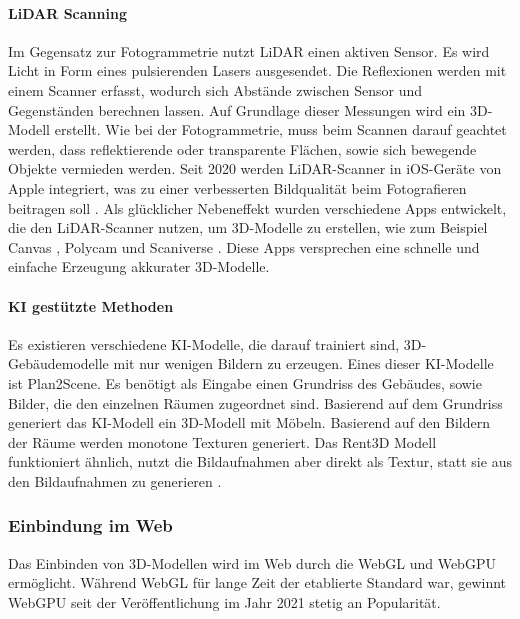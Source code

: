 \paragraph{LiDAR Scanning}
Im Gegensatz zur Fotogrammetrie nutzt \ac{LiDAR} einen aktiven Sensor. Es wird Licht in Form eines pulsierenden Lasers ausgesendet. Die Reflexionen werden mit einem Scanner erfasst, wodurch sich Abstände zwischen Sensor und Gegenständen berechnen lassen. Auf Grundlage dieser Messungen wird ein 3D-Modell erstellt. Wie bei der Fotogrammetrie, muss beim Scannen darauf geachtet werden, dass reflektierende oder transparente Flächen, sowie sich bewegende Objekte vermieden werden. Seit 2020 werden \ac{LiDAR}-Scanner in iOS-Geräte von Apple integriert, was zu einer verbesserten Bildqualität beim Fotografieren beitragen soll \cite{Fenstermaker2022}. Als glücklicher Nebeneffekt wurden verschiedene Apps entwickelt, die den \ac{LiDAR}-Scanner nutzen, um 3D-Modelle zu erstellen, wie zum Beispiel Canvas \cite{Canvas2023}, Polycam \cite{Polycam2024} und Scaniverse \cite{Scaniverse2024}. Diese Apps versprechen eine schnelle und einfache Erzeugung akkurater 3D-Modelle.

\paragraph{KI gestützte Methoden}
Es existieren verschiedene \ac{KI}-Modelle, die darauf trainiert sind, 3D-Gebäudemodelle mit nur wenigen Bildern zu erzeugen. Eines dieser \ac{KI}-Modelle ist Plan2Scene. Es benötigt als Eingabe einen Grundriss des Gebäudes, sowie Bilder, die den einzelnen Räumen zugeordnet sind. Basierend auf dem Grundriss generiert das \ac{KI}-Modell ein 3D-Modell mit Möbeln. Basierend auf den Bildern der Räume werden monotone Texturen generiert.\cite[S.~10733]{Plan2Scene2021} Das Rent3D Modell funktioniert ähnlich, nutzt die Bildaufnahmen aber direkt als Textur, statt sie aus den Bildaufnahmen zu generieren \cite[S.~3413]{Rent3D2015}.

\subsubsection{Einbindung im Web}
Das Einbinden von 3D-Modellen wird im Web durch die \ac{WebGL} und WebGPU ermöglicht. Während \ac{WebGL} für lange Zeit der etablierte Standard war, gewinnt WebGPU seit der Veröffentlichung im Jahr 2021 stetig an Popularität.

